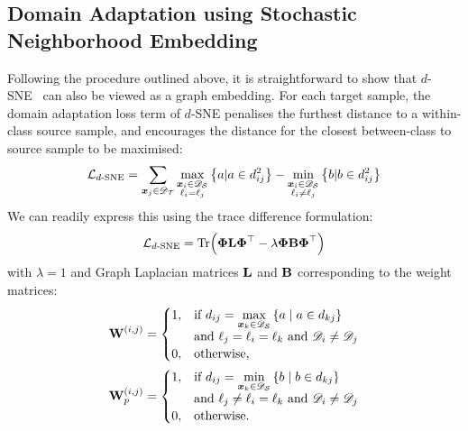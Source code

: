 \documentclass[journal]{IEEEtran}
\renewcommand{\vector}[1]{\ensuremath{\bm{\lowercase{#1}}}}
\renewcommand{\matrix}[1]{\ensuremath{\bm{\mathbf{\uppercase{#1}}}}}
\newcommand{\vx}{\vector{x}}
\newcommand{\Domain}{\mathscr{D}} \newcommand{\Task}{\mathscr{T}} \newcommand{\concept}[1]{\ensuremath{\mathcal{\uppercase{#1}}}}
\newcommand{\Src}{\mathcal{S}} \newcommand{\Tgt}{\mathcal{T}}
\newcommand{\tr}{\text{Tr}}
\begin{document}
\subsection{Domain Adaptation using Stochastic Neighborhood Embedding} \label{sec:dage-dsne}
Following the procedure outlined above, it is straightforward to show that $d$-SNE~\cite{xu2019dsne} can also be viewed as a graph embedding.
For each target sample, the domain adaptation loss term of $d$-SNE penalises the furthest distance to a within-class source sample, and encourages the distance for the closest between-class to source sample to be maximised:
\begin{equation}
\concept{L}_{d\text{-SNE}}
    = \sum_{\vx_j \in \Domain_\Tgt}
        \max_{\substack{
            \vx_i \in \Domain_\Src\\
            \ell_i = \ell_j
        }}
            \left\{ 
                a | a \in d_{ij}^2 
            \right\}
        -
        \min_{\substack{
            \vx_i \in \Domain_\Src\\
            \ell_i \neq \ell_j
        }}
            \left\{ 
                b | b \in d_{ij}^2 
            \right\}
     \label{eq:dsn-loss-sum}
\end{equation}
We can readily express this using the trace difference formulation:
\begin{equation}\label{eq:dsne-loss-trace-diff}
    \concept{L}_{d\text{-SNE}} 
    = \tr\Big(\matrix{\Phi} \matrix{L} \matrix{\Phi}^\top  - \lambda \matrix{\Phi} \matrix{B} \matrix{\Phi}^\top \Big)
\end{equation}
with $\lambda = 1$ and  Graph Laplacian matrices $\matrix{L}$ and $\matrix{B}$ corresponding to the weight matrices:
\begin{align}
    \label{eq:dsne-w-matrix}
	\matrix{W}^{(i,j)} &= 
        \begin{cases}
            1, &    
                \!\begin{aligned}[t]
                   &\text{if } d_{ij} = \max_{\vx_k \in \Domain_\Src} \left\{ a \mid a \in d_{kj} \right\}  \\
                   &\text{and } \ell_j=\ell_i=\ell_k 
                   \text{ and } \Domain_i \neq \Domain_j
                \end{aligned}
            \\
            0, & \text{otherwise, } \\
        \end{cases} 
    \\
    \label{eq:dsne-wp-matrix}
    \matrix{W}_p^{(i,j)} &= 
        \begin{cases}
            1, &    
                \!\begin{aligned}[t]
                   &\text{if } d_{ij} = \min_{\vx_k \in \Domain_\Src} \left\{ b \mid b \in d_{kj} \right\}   \\
                   &\text{and } \ell_j \neq \ell_i=\ell_k
                   \text{ and } \Domain_i \neq \Domain_j
                \end{aligned}
            \\
            0, & \text{otherwise.} \\
        \end{cases}
\end{align}
\end{document}
